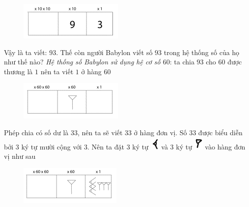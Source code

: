 \begin{multicols}{2}
\begin{figure}[H]
		\includegraphics[width=0.65\linewidth]{20}
		\vspace*{-10pt}
	\end{figure}
	Vậy là ta viết: $93$.
	\vskip 0.1cm
	Thế còn người Babylon viết số $93$ trong hệ thống số của họ như thế nào?
	\vskip 0.1cm
	\textit{Hệ thống số Babylon sử dụng hệ cơ số $60$}: ta chia $93$ cho $60$ được thương là $1$ nên ta viết $1$ ở hàng $60$
	\begin{figure}[H]
		\centering
		\vspace*{-5pt}
		\captionsetup{labelformat= empty, justification=centering}
		\includegraphics[width=0.65\linewidth]{21}
		\vspace*{-10pt}
	\end{figure}
	Phép chia có số dư là $33$, nên ta sẽ viết $33$ ở hàng đơn vị. Số $33$ được biểu diễn bởi $3$ ký tự mười cộng với $3$. Nên ta đặt $3$ ký tự \includegraphics[scale=0.65]{16} và $3$ ký tự \includegraphics[scale=0.65]{15} vào hàng đơn vị như sau
	\begin{figure}[H]
		\centering
		\vspace*{-5pt}
		\captionsetup{labelformat= empty, justification=centering}
		\includegraphics[width=0.65\linewidth]{22}
		\vspace*{-10pt}

\end{figure}
\end{multicols}
